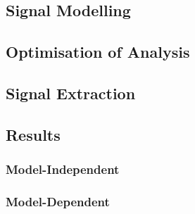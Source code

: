 \subsection{Signal Modelling}

\subsection{Optimisation of Analysis}

\subsection{Signal Extraction}

\subsection{Results}

\subsubsection{Model-Independent}

\subsubsection{Model-Dependent}
